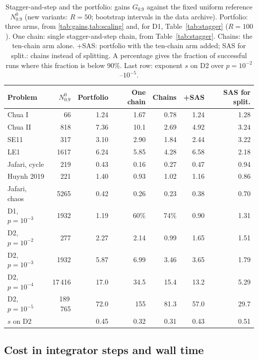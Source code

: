 \begin{table}[tbhp]
\caption{Stagger-and-step and the portfolio: gains $G_{0.9}$ against the fixed uniform reference $N^0_{0.9}$ (new variants: $R=50$; bootstrap intervals in the data archive). Portfolio: three arms, from \cref{tab:gains,tab:scaling} and, for D1, Table~\ref{tab:stagger} ($R=100$). One chain: single stagger-and-step chain, from Table~\ref{tab:stagger}. Chains: the ten-chain arm alone. +SAS: portfolio with the ten-chain arm added; SAS for split.: chains instead of splitting. A percentage gives the fraction of successful runs where this fraction is below 90\%. Last row: exponent $s$ on D2 over $p=10^{-2}$--$10^{-5}$.}
\label{tab:psas}
\centering\scriptsize
\setlength{\tabcolsep}{4pt}
\begin{tabular}{lrrrrrr}
\toprule
Problem & $N^0_{0.9}$ & Portfolio & One chain & Chains & +SAS & SAS for split. \\
\midrule
Chua I & 66 & 1.24 & 1.67 & 0.78 & 1.24 & 1.28 \\
Chua II & 818 & 7.36 & 10.1 & 2.69 & 4.92 & 3.24 \\
SE11 & 317 & 3.10 & 2.90 & 1.84 & 2.44 & 3.22 \\
LE1 & 1617 & 6.24 & 5.85 & 4.28 & 6.58 & 2.18 \\
Jafari, cycle & 219 & 0.43 & 0.16 & 0.27 & 0.47 & 0.94 \\
Huynh 2019 & 221 & 1.40 & 0.93 & 1.02 & 1.16 & 0.86 \\
Jafari, chaos & 5265 & 0.42 & 0.26 & 0.23 & 0.38 & 0.70 \\
D1, $p=10^{-3}$ & 1932 & 1.19 & 60\% & 74\% & 0.90 & 1.31 \\
D2, $p=10^{-2}$ & 277 & 2.27 & 2.14 & 0.99 & 1.65 & 1.51 \\
D2, $p=10^{-3}$ & 1932 & 5.87 & 6.99 & 3.46 & 3.65 & 1.79 \\
D2, $p=10^{-4}$ & 17\,416 & 17.0 & 34.5 & 15.4 & 13.2 & 5.29 \\
D2, $p=10^{-5}$ & 189\,765 & 72.0 & 155 & 81.3 & 57.0 & 29.7 \\
\midrule
$s$ on D2 & & 0.45 & 0.32 & 0.31 & 0.43 & 0.51 \\
\bottomrule
\end{tabular}
\end{table}

\subsection{Cost in integrator steps and wall time}\label{sec:cost}

